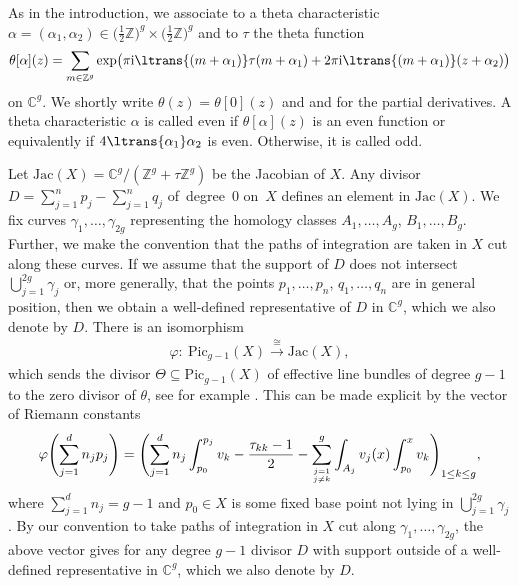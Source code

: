 \documentclass[10pt,a4paper]{amsart}
\numberwithin{equation}{section}
\newcommand\gf[2]{\genfrac{}{}{0pt}{}{#1}{#2}}
\begin{document}
As in the introduction, we associate to a theta characteristic $\alpha=(\alpha_1,\alpha_2)\in \bigl(\frac{1}{2}\mathbb{Z}\bigr)^{g}\times\bigl(\frac{1}{2}\mathbb{Z}\bigr)^{g}$ and to $\tau$ the theta function
\[\theta[\alpha](z)=\sum_{m\in \mathbb{Z}^g}\exp\bigl(\pi {\rm i}\ltrans{(m+\alpha_1)}\tau(m+\alpha_1)+2\pi {\rm i}\ltrans{(m+\alpha_1)}(z+\alpha_2)\bigr)
\]
on $\mathbb{C}^g$. We shortly write $\theta(z)=\theta[0](z)$ and  and  for the partial derivatives. A theta characteristic $\alpha$ is called even if $\theta[\alpha](z)$ is an even function or equivalently if $4\ltrans{\alpha_1}\alpha_2$ is even. Otherwise, it is called odd.

Let $\mathrm{Jac}(X)=\mathbb{C}^g/(\mathbb{Z}^g+\tau\mathbb{Z}^g)$ be the Jacobian of $X$. Any divisor $D=\sum_{j=1}^n p_j-\sum_{j=1}^n q_j$ of~degree~$0$ on~$X$ defines an element  in $\mathrm{Jac}(X)$. We fix curves $\gamma_1,\dots,\gamma_{2g}$ representing the homology classes $A_1,\dots,A_g$, $B_1,\dots,B_g$. Further, we make the convention that the paths of integration are taken in $X$ cut along these curves. If we assume that the support of $D$ does not intersect $\bigcup_{j=1}^{2g}\gamma_j$ or, more generally, that the points $p_1,\dots, p_n$, $q_1,\dots,q_n$ are in general position, then we obtain a well-defined representative of $D$ in $\mathbb{C}^g$, which we also denote by $D$. There is an isomorphism
\begin{align}\label{picjacisom}
	\varphi\colon\ \mathrm{Pic}_{g-1}(X)\xrightarrow{\cong} \mathrm{Jac}(X),
\end{align}
which sends the divisor $\Theta\subseteq \mathrm{Pic}_{g-1}(X)$ of effective line bundles of degree $g-1$ to the zero divisor of $\theta$, see for example \cite[Corollary II.3.6]{Mum83}. This can be made explicit by the vector of Riemann constants
\[
\varphi\Biggl(\sum_{j=1}^d n_j p_j\Biggr)=\Biggl(\sum_{j=1}^d n_j\int_{p_0}^{p_j} v_k-\frac{\tau_{kk}-1}{2}-\sum_{\gf{j=1}{j\neq k}}^{g}\int_{A_j}v_j(x)\int_{p_0}^x v_k\Biggr)_{1\le k\le g},\]
where $\sum_{j=1}^d n_j=g-1$ and $p_0\in X$ is some fixed base point not lying in $\bigcup_{j=1}^{2g}\gamma_j$. By our convention to take paths of integration in $X$ cut along $\gamma_1,\dots,\gamma_{2g}$, the above vector gives for any degree $g-1$ divisor $D$ with support outside of  a well-defined representative in $\mathbb{C}^g$, which we also denote by $D$.
\end{document}
